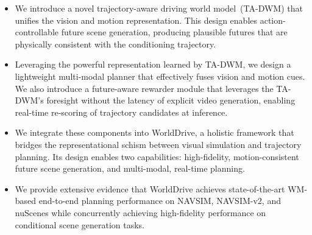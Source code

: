 \begin{itemize}
    \item We introduce a novel trajectory-aware driving world model~(TA-DWM) that unifies the vision and motion representation. This design enables action-controllable future scene generation, producing plausible futures that are physically consistent with the conditioning trajectory.
    \item Leveraging the powerful representation learned by TA-DWM, we design a lightweight multi-modal planner that effectively fuses vision and motion cues. We also introduce a future-aware rewarder module that leverages the TA-DWM's foresight without the latency of explicit video generation, enabling real-time re-scoring of trajectory candidates at inference.
    \item We integrate these components into WorldDrive, a holistic framework that bridges the representational schism between visual simulation and trajectory planning. Its design enables two capabilities: high-fidelity, motion-consistent future scene generation, and multi-modal, real-time planning.
    \item We provide extensive evidence that WorldDrive achieves state-of-the-art WM-based end-to-end planning performance on NAVSIM, NAVSIM-v2, and nuScenes while concurrently achieving high-fidelity performance on conditional scene generation tasks.
\end{itemize}



